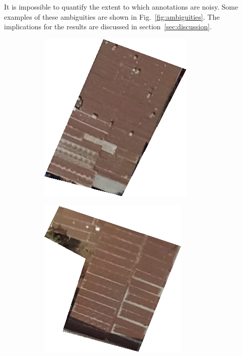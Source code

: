 \documentclass[11pt]{article}
\begin{document}
	It is impossible to quantify the extent to which annotations are noisy. 
	Some examples of these ambiguities are shown in Fig.~\ref{fig:ambiguities}.
	The implications for the results are discussed in section~\ref{sec:discussion}.
	
	\begin{figure}
		\centering
		\begin{subfigure}[c]{0.27\textwidth}
			\centering
			\includegraphics[width=.72\textwidth]{figures/wrong_labels/hm_rusty.png}
		\end{subfigure}	
		\begin{subfigure}[c]{0.27\textwidth}
			\centering
			\includegraphics[width=.72\textwidth]{figures/wrong_labels/irr_rusty.png}

\end{subfigure}
\end{figure}
\end{document}
